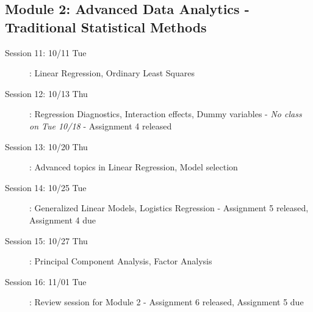\documentclass[10pt, letterpaper, twoside]{memoir}\usepackage{knitr}
\begin{document}
\subsection{Module 2: Advanced Data Analytics - Traditional Statistical Methods}
\begin{description}
\item [Session 11: 10/11 Tue]: Linear Regression, Ordinary Least Squares

\item [Session 12: 10/13 Thu]: Regression Diagnostics, Interaction effects, Dummy variables 
    - \emph{No class on Tue 10/18}
    - Assignment 4 released

\item [Session 13: 10/20 Thu]: Advanced topics in Linear Regression, Model selection
    
\item [Session 14: 10/25 Tue]: Generalized Linear Models, Logistics Regression
    - Assignment 5 released, Assignment 4 due
    

\item [Session 15: 10/27 Thu]: Principal Component Analysis, Factor Analysis
   
    
    
\item [Session 16: 11/01 Tue]: Review session for Module 2
    - Assignment 6 released, Assignment 5 due
\end{description}
\end{document}
